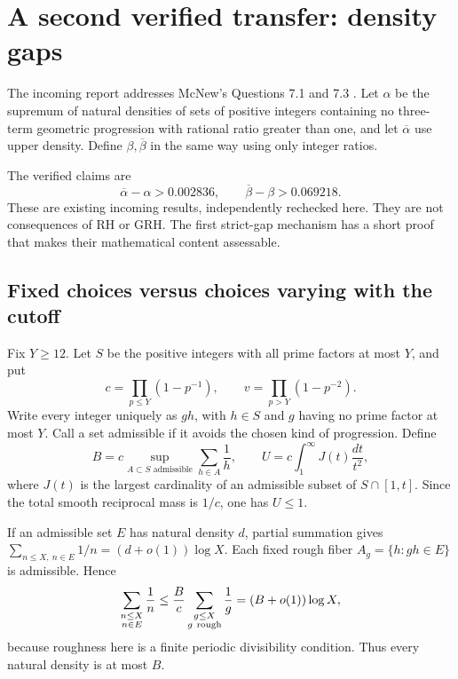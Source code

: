 \section{A second verified transfer: density gaps}
\label{sec:density}

The incoming report \cite{IncomingDensity} addresses McNew's Questions 7.1
and 7.3 \cite{McNew}. Let \(\alpha\) be the supremum of natural densities
of sets of positive integers containing no three-term geometric
progression with rational ratio greater than one, and let
\(\overline\alpha\) use upper density. Define \(\beta,\overline\beta\)
in the same way using only integer ratios.

The verified claims are
\begin{equation}
\overline\alpha-\alpha>0.002836,\qquad
\overline\beta-\beta>0.069218.
\label{eq:density-gaps}
\end{equation}
These are existing incoming results, independently rechecked here.
They are not consequences of RH or GRH. The first strict-gap mechanism
has a short proof that makes their mathematical content assessable.

\subsection{Fixed choices versus choices varying with the cutoff}

Fix \(Y\ge12\). Let \(S\) be the positive integers with all prime factors
at most \(Y\), and put
\[
c=\prod_{p\le Y}(1-p^{-1}),\qquad
v=\prod_{p>Y}(1-p^{-2}).
\]
Write every integer uniquely as \(gh\), with \(h\in S\) and \(g\)
having no prime factor at most \(Y\). Call a set admissible if it
avoids the chosen kind of progression. Define
\[
B=c\sup_{A\subset S\text{ admissible}}\sum_{h\in A}\frac1h,\qquad
U=c\int_1^\infty J(t)\frac{dt}{t^2},
\]
where \(J(t)\) is the largest cardinality of an admissible subset of
\(S\cap[1,t]\). Since the total smooth reciprocal mass is \(1/c\),
one has \(U\le1\).

If an admissible set \(E\) has natural density \(d\), partial summation
gives
\(\sum_{n\le X,\ n\in E}1/n=(d+o(1))\log X\).
Each fixed rough fiber \(A_g=\{h:gh\in E\}\) is admissible. Hence
\[
\sum_{\substack{n\le X\\n\in E}}\frac1n
\le \frac Bc\sum_{\substack{g\le X\\g\ {\rm rough}}}\frac1g
=(B+o(1))\log X,
\]
because roughness here is a finite periodic divisibility condition.
Thus every natural density is at most \(B\).

